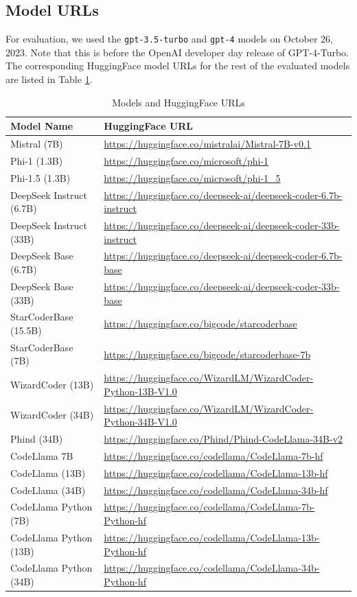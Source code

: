 \subsection{Model URLs}\label{sec:appendix-models}
For evaluation, we used the \texttt{gpt-3.5-turbo} and \texttt{gpt-4} models on October 26, 2023. Note that this is before the OpenAI developer day release of GPT-4-Turbo. The corresponding HuggingFace model URLs for the rest of the evaluated models are listed in Table \ref{tab:model-url-list}.

\begin{table}[h]
    \centering
    \small
    \caption{Models and HuggingFace URLs}
    \begin{tabular}{|ll|}
        \hline
        \textbf{Model Name} & \textbf{HuggingFace URL} \\
        \hline
        Mistral (7B) & \url{https://huggingface.co/mistralai/Mistral-7B-v0.1} \\
        Phi-1 (1.3B) & \url{https://huggingface.co/microsoft/phi-1} \\
        Phi-1.5 (1.3B) & \url{https://huggingface.co/microsoft/phi-1_5} \\
        DeepSeek Instruct (6.7B) & \url{https://huggingface.co/deepseek-ai/deepseek-coder-6.7b-instruct} \\
        DeepSeek Instruct (33B) & \url{https://huggingface.co/deepseek-ai/deepseek-coder-33b-instruct} \\
        DeepSeek Base (6.7B) & \url{https://huggingface.co/deepseek-ai/deepseek-coder-6.7b-base} \\
        DeepSeek Base (33B) & \url{https://huggingface.co/deepseek-ai/deepseek-coder-33b-base} \\
        StarCoderBase (15.5B) & \url{https://huggingface.co/bigcode/starcoderbase} \\
        StarCoderBase (7B) & \url{https://huggingface.co/bigcode/starcoderbase-7b} \\
        WizardCoder (13B) & \url{https://huggingface.co/WizardLM/WizardCoder-Python-13B-V1.0} \\
        WizardCoder (34B) & \url{https://huggingface.co/WizardLM/WizardCoder-Python-34B-V1.0} \\
        Phind (34B) & \url{https://huggingface.co/Phind/Phind-CodeLlama-34B-v2} \\
        CodeLlama 7B & \url{https://huggingface.co/codellama/CodeLlama-7b-hf} \\
        CodeLlama (13B) & \url{https://huggingface.co/codellama/CodeLlama-13b-hf} \\
        CodeLlama (34B) & \url{https://huggingface.co/codellama/CodeLlama-34b-hf} \\
        CodeLlama Python (7B) & \url{https://huggingface.co/codellama/CodeLlama-7b-Python-hf} \\
        CodeLlama Python (13B) & \url{https://huggingface.co/codellama/CodeLlama-13b-Python-hf} \\
        CodeLlama Python (34B) & \url{https://huggingface.co/codellama/CodeLlama-34b-Python-hf} \\
        \hline
    \end{tabular}
    \label{tab:model-url-list}
\end{table}
